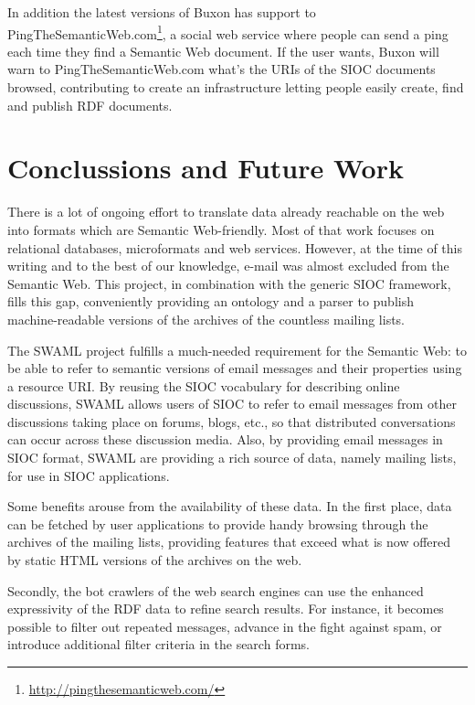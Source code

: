 \documentclass{llncs}
\begin{document}
In addition the latest versions of Buxon has support to 
PingTheSemanticWeb.com\footnote{\url{http://pingthesemanticweb.com/}}, 
a social web service where people can send a ping each time they find 
a Semantic Web document. If the user wants, Buxon will warn to 
PingTheSemanticWeb.com what's the URIs of the SIOC documents browsed,
contributing to create an infrastructure letting people easily create, 
find and publish RDF documents.

\section{\label{sec:conclussions}Conclussions and Future Work}

There is a lot of ongoing effort to translate data already reachable
on the web into formats which are Semantic Web-friendly. Most of that 
work focuses on relational databases, microformats and web services. 
However, at the time of this writing and to the best of our knowledge, 
e-mail was almost excluded from the Semantic Web. This project, in 
combination with the generic SIOC framework, fills this gap, conveniently 
providing an ontology and a parser to publish machine-readable versions 
of the archives of the countless mailing lists.

The SWAML project fulfills a much-needed requirement for the Semantic Web: 
to be able to refer to semantic versions of email messages and their 
properties using a resource URI. By reusing the SIOC vocabulary for describing
online discussions, SWAML allows users of SIOC to refer to email messages 
from other discussions taking place on forums, blogs, etc., so that distributed 
conversations can occur across these discussion media. Also, by providing email 
messages in SIOC format, SWAML are providing a rich source of data, namely 
mailing lists, for use in SIOC applications.

Some benefits arouse from the availability of these data. In the first
place, data can be fetched by user applications to provide handy browsing
through the archives of the mailing lists, providing features that
exceed what is now offered by static HTML versions of the archives on
the web.

Secondly, the bot crawlers of the web search engines can use the enhanced
expressivity of the RDF data to refine search results. For instance, it
becomes possible to filter out repeated messages, advance in the fight against
spam, or introduce additional filter criteria in the search forms.
\end{document}
